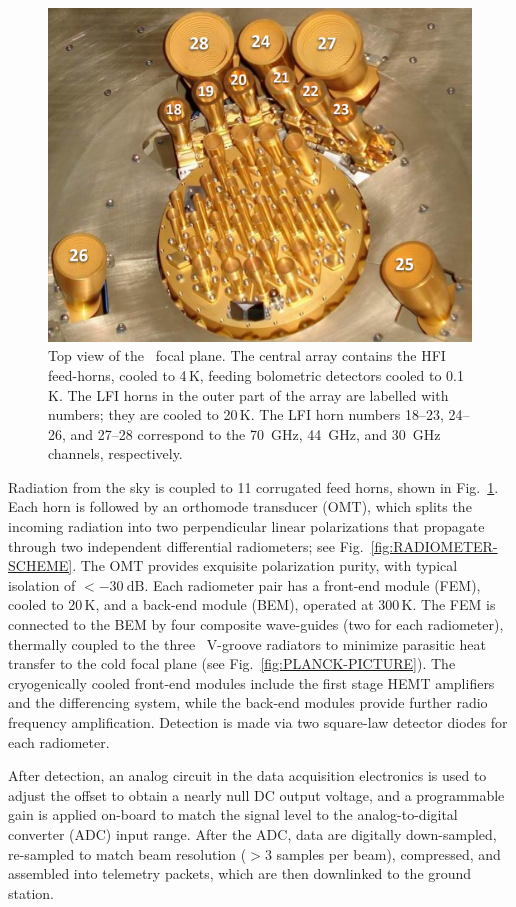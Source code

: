 \documentclass[onecolumn]{aa}
\begin{document}
\begin{figure}[t]
	\center
	\includegraphics[width=0.5\linewidth]{figs/FOCAL-PLANE.png}
	\caption{Top view of the \Planck\ focal plane. The central array contains
    the HFI feed-horns, cooled to 4\,K, feeding bolometric detectors cooled to
    0.1\,K. The LFI horns in the outer part of the array are labelled with
    numbers; they are cooled to 20\,K. The LFI horn numbers 18--23, 24--26, and
    27--28 correspond to the 70~GHz, 44~GHz, and 30~GHz channels, respectively. }
	\label{fig:FOCAL-PLANE}
\end{figure}

Radiation from the sky is coupled to 11 corrugated feed horns, shown in
Fig.~\ref{fig:FOCAL-PLANE}. Each horn is followed by an orthomode
transducer (OMT), which splits the incoming radiation into two
perpendicular linear polarizations that propagate through two
independent differential radiometers; see
Fig.~\ref{fig:RADIOMETER-SCHEME}. The OMT provides exquisite
polarization purity, with typical isolation of ${<-30~\mathrm{dB}}$. Each
radiometer pair has a front-end module (FEM), cooled to 20\,K, and a
back-end module (BEM), operated at 300\,K. The FEM is connected to the
BEM by four composite wave-guides (two for each radiometer), thermally
coupled to the three \Planck\ V-groove radiators to minimize parasitic
heat transfer to the cold focal plane (see
Fig.~\ref{fig:PLANCK-PICTURE}). The cryogenically cooled front-end
modules include the first stage HEMT amplifiers and the differencing
system, while the back-end modules provide further radio frequency
amplification. Detection is made via two square-law detector diodes for
each radiometer.

After detection, an analog circuit in the data acquisition electronics
is used to adjust the offset to obtain a nearly null DC output
voltage, and a programmable gain is applied on-board to match the signal level
to the analog-to-digital converter (ADC) input range. After the ADC,
data are digitally down-sampled, re-sampled to match beam resolution
($>3$ samples per beam), compressed, and assembled into telemetry
packets, which are then downlinked to the ground station.
\end{document}
